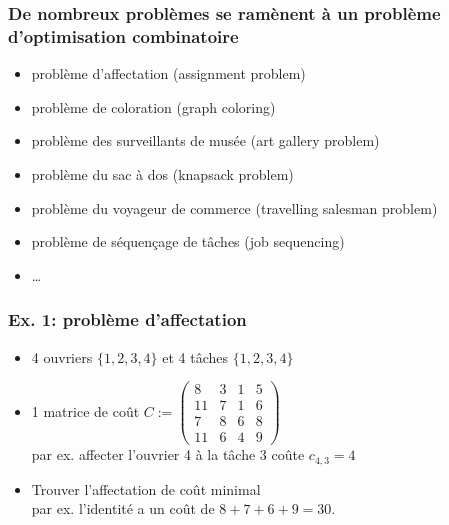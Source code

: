 \documentclass{beamer}
\begin{document}
\begin{frame}
  \frametitle{De nombreux problèmes se ramènent à un problème
    d'optimisation combinatoire}

  \begin{itemize}
    \item \alert{problème d'affectation (assignment problem)}
    \item \alert{problème de coloration (graph coloring)}
    \item problème des surveillants de musée (art gallery problem)
    \item problème du sac à dos (knapsack problem)
    \item problème du voyageur de commerce (travelling salesman problem)
    \item problème de séquençage de tâches (job sequencing)
    \item \dots
  \end{itemize}
  
\end{frame}

\begin{frame}
  \frametitle{Ex. 1: problème d'affectation}

  \begin{itemize}
  \item 4 ouvriers $\{1,2,3,4\}$ et 4 tâches $\{1,2,3,4\}$
  \item 1 matrice de coût
    $C := \left(
    \begin{array}{cccc}
      8 & 3 & 1 & 5 \\
      11 & 7 & 1 & 6 \\
      7 & 8 & 6 & 8 \\
      11 & 6 & 4 & 9 
    \end{array}
    \right)$ \\
    par ex. affecter l'ouvrier 4 à la tâche 3 coûte $c_{4,3} = 4$ 
  \item Trouver l'affectation de coût minimal \\
    par ex. l'identité a un coût de $8+7+6+9=30$. 
  \end{itemize}

\end{frame}
\end{document}
